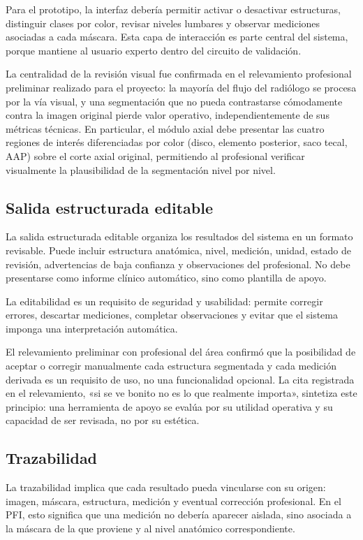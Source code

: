 Para el prototipo, la interfaz debería permitir activar o desactivar estructuras, distinguir clases por color, revisar niveles lumbares y observar mediciones asociadas a cada máscara. Esta capa de interacción es parte central del sistema, porque mantiene al usuario experto dentro del circuito de validación.

La centralidad de la revisión visual fue confirmada en el relevamiento profesional preliminar realizado para el proyecto: la mayoría del flujo del radiólogo se procesa por la vía visual, y una segmentación que no pueda contrastarse cómodamente contra la imagen original pierde valor operativo, independientemente de sus métricas técnicas. En particular, el módulo axial debe presentar las cuatro regiones de interés diferenciadas por color (disco, elemento posterior, saco tecal, AAP) sobre el corte axial original, permitiendo al profesional verificar visualmente la plausibilidad de la segmentación nivel por nivel.

\subsection{Salida estructurada editable}

La salida estructurada editable organiza los resultados del sistema en un formato revisable. Puede incluir estructura anatómica, nivel, medición, unidad, estado de revisión, advertencias de baja confianza y observaciones del profesional. No debe presentarse como informe clínico automático, sino como plantilla de apoyo.

La editabilidad es un requisito de seguridad y usabilidad: permite corregir errores, descartar mediciones, completar observaciones y evitar que el sistema imponga una interpretación automática.

El relevamiento preliminar con profesional del área confirmó que la posibilidad de aceptar o corregir manualmente cada estructura segmentada y cada medición derivada es un requisito de uso, no una funcionalidad opcional. La cita registrada en el relevamiento, «si se ve bonito no es lo que realmente importa», sintetiza este principio: una herramienta de apoyo se evalúa por su utilidad operativa y su capacidad de ser revisada, no por su estética.

\subsection{Trazabilidad}

La trazabilidad implica que cada resultado pueda vincularse con su origen: imagen, máscara, estructura, medición y eventual corrección profesional. En el PFI, esto significa que una medición no debería aparecer aislada, sino asociada a la máscara de la que proviene y al nivel anatómico correspondiente.

